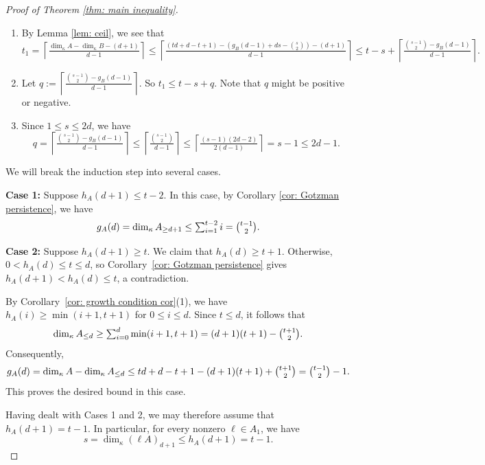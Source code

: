 \documentclass[11pt]{amsart}
\theoremstyle{definition}
\newcommand{\dimk}{\dim_{\kappa}}
\newcommand{\tsum}{\mathop{\textstyle\sum}\nolimits}
\begin{document}
\begin{proof}[Proof of Theorem \ref{thm: main inequality}]
\begin{enumerate}
\item By Lemma \ref{lem: ceil}, we see that
\[
t_1
= \left\lceil\tfrac{\dimk A- \dimk B-(d+1)}{d-1}\right\rceil
\leq \left\lceil\tfrac{(td+d-t+1)- (g_B(d-1) +ds -\binom{s}{2}) -(d+1)}{d-1} \right\rceil
\leq t-s + \left\lceil \tfrac{\binom{s-1}{2} -g_{B}(d-1) }{d-1} \right\rceil.
\]

\item Let $q:=\left\lceil \frac{\binom{s-1}{2} -g_{B}(d-1) }{d-1} \right\rceil$. So $t_1 \leq t-s+q$. Note that $q$ might be positive or negative.

\item 
Since $1\leq s\leq 2d$, we have
\[
q=
\left\lceil\tfrac{\binom{s-1}{2} -g_{B}(d-1) }{d-1} \right\rceil
\leq \left\lceil \tfrac{\binom{s-1}{2}}{d-1} \right\rceil
\leq \left\lceil  \tfrac{(s-1)(2d-2)}{2(d-1)} \right\rceil
= s-1 \leq 2d-1.
\]


\end{enumerate}
We will break the induction step into several cases.

\noindent\textbf{Case 1:} Suppose $h_A(d+1)\leq t-2$. In this case, by Corollary \ref{cor: Gotzman persistence}, we have
\[
g_A(d)
=\dimk A_{\ge d+1}
\le \tsum_{i=1}^{t-2} i
=\tbinom{t-1}{2}.
\]


\noindent\textbf{Case 2:} Suppose $h_A(d+1)\geq t$. We claim that $h_A(d)\ge t+1$. Otherwise, $0<h_A(d)\le t\le d$, so Corollary~\ref{cor: Gotzman persistence} gives $h_A(d+1)<h_A(d)\le t$, a contradiction.

By Corollary~\ref{cor: growth condition cor}(1), we have $h_A(i)\ge\min(i+1,t+1)$ for $0\le i\le d$. Since $t\le d$, it follows that
\[
\dimk A_{\le d}
\ge \tsum_{i=0}^{d}\min(i+1,t+1)
= (d+1)(t+1)-\tbinom{t+1}{2}.
\]
Consequently,
\[
g_A(d)
= \dimk A-\dimk A_{\le d}
\le td+d-t+1-(d+1)(t+1)+\tbinom{t+1}{2}
= \tbinom{t-1}{2}-1.
\]
This proves the desired bound in this case.

Having dealt with Cases 1 and 2, we may therefore assume that $h_A(d+1)=t-1$. In particular, for every nonzero $\ell\in A_1$, we have 
\[
s=\dimk (\ell A)_{d+1}
\leq h_A(d+1)=t-1.
\]






\end{proof}
\end{document}
